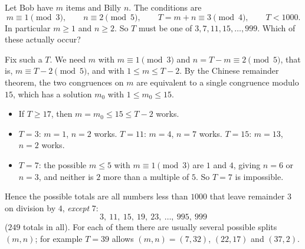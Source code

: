 Let Bob have $m$ items and Billy $n$. The conditions are
\[m\equiv1\pmod3,\qquad n\equiv2\pmod5,\qquad T=m+n\equiv3\pmod4,\qquad T<1000 .\]
In particular $m\ge1$ and $n\ge2$. So $T$ must be one of $3,7,11,15,\dots,999$. Which of these actually occur?

Fix such a $T$. We need $m$ with $m\equiv1\pmod3$ and $n=T-m\equiv2\pmod5$, that is, $m\equiv T-2\pmod5$, and with $1\le m\le T-2$. By the Chinese remainder theorem, the two congruences on $m$ are equivalent to a single congruence modulo $15$, which has a solution $m_0$ with $1\le m_0\le15$.
\begin{itemize}
\item If $T\ge17$, then $m=m_0\le15\le T-2$ works.
\item $T=3$: $m=1$, $n=2$ works. $T=11$: $m=4$, $n=7$ works. $T=15$: $m=13$, $n=2$ works.
\item $T=7$: the possible $m\le5$ with $m\equiv1\pmod3$ are $1$ and $4$, giving $n=6$ or $n=3$, and neither is $2$ more than a multiple of $5$. So $T=7$ is impossible.
\end{itemize}
Hence the possible totals are all numbers less than $1000$ that leave remainder $3$ on division by $4$, \emph{except} $7$:
\[\boxed{3,\ 11,\ 15,\ 19,\ 23,\ \dots,\ 995,\ 999}\]
($249$ totals in all). For each of them there are usually several possible splits $(m,n)$; for example $T=39$ allows $(m,n)=(7,32)$, $(22,17)$ and $(37,2)$.
